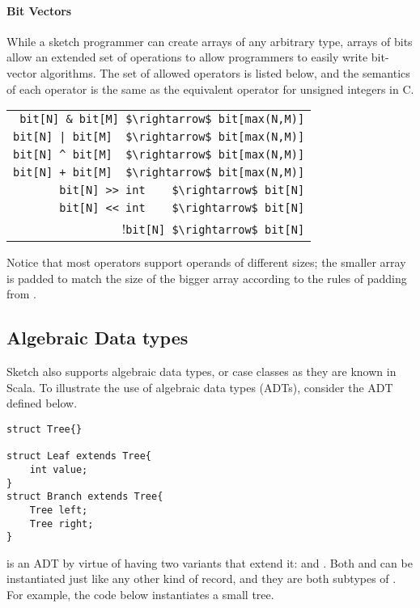 \paragraph{Bit Vectors}
While a sketch programmer can create arrays of any arbitrary type, arrays of bits allow an extended set of operations to allow programmers to easily write bit-vector algorithms. The set of allowed operators is listed below, and the semantics of each operator is the same as the equivalent operator for unsigned integers in C.
\begin{center}
\begin{tabular}{r}
\lstinline!bit[N] & bit[M] $\rightarrow$ bit[max(N,M)]!\\
\lstinline!bit[N] | bit[M]  $\rightarrow$ bit[max(N,M)]!\\
\lstinline!bit[N] ^ bit[M]  $\rightarrow$ bit[max(N,M)]!\\
\lstinline!bit[N] + bit[M]  $\rightarrow$ bit[max(N,M)]!\\
\lstinline!bit[N] >> int    $\rightarrow$ bit[N]!\\
\lstinline!bit[N] << int    $\rightarrow$ bit[N]!\\
!\lstinline!bit[N] $\rightarrow$ bit[N]!\\
\end{tabular}
\end{center}

Notice that most operators support operands of different sizes; the smaller array is padded to match the size of the bigger array according to the rules of padding from . 



\subsection{Algebraic Data types}
Sketch also supports algebraic data types, or case classes as they are known in Scala. To illustrate the use of algebraic data types (ADTs), consider the  ADT defined below. 
\begin{lstlisting}
struct Tree{}

struct Leaf extends Tree{
	int value;
}
struct Branch extends Tree{
	Tree left;
	Tree right;
}
\end{lstlisting}
 is an ADT by virtue of having two variants that extend it:  and . Both  and  can be instantiated just like any other kind of record, and they are both subtypes of . For example, the code below instantiates a small tree.

